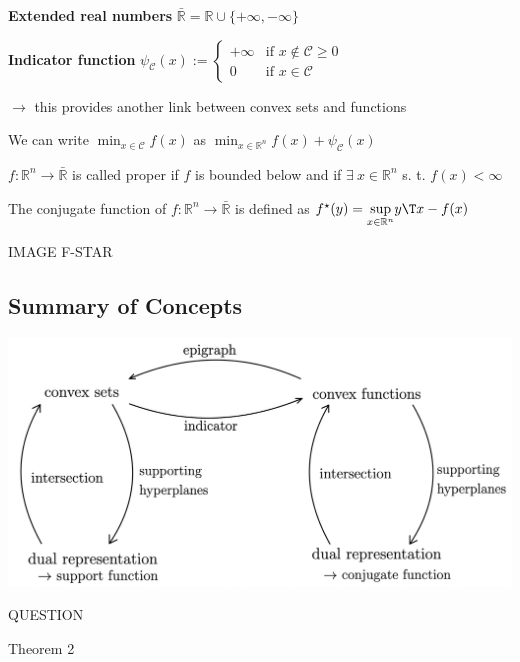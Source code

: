 \textbf{Extended real numbers} $\bar{\mathbb{R}} = \mathbb{R} \cup \{+\infty, -\infty\}$


\textbf{Indicator function}
$\psi_\mathcal{C}(x) := \begin{cases} +\infty &\text{if } x \notin\mathcal{C} \ge 0 \\ 0 &\text{if } x \in\mathcal{C} \end{cases}$

$\rightarrow$ this provides another link between convex sets and functions

We can write
$\min_{x \in \mathcal{C}}f(x)$ as
$\min_{x \in \mathbb{R}^{n}}f(x) + \psi_\mathcal{C}(x)$

\begin{definition}[3]
	$f: \mathbb{R}^{n}\rightarrow\bar{\mathbb{R}}$ is called proper
	if $f$ is bounded below and
	if $\exists\ x \in \mathbb{R}^{n}$ s. t. $f(x)<\infty$
\end{definition}

\begin{definition}
	The conjugate function of $f: \mathbb{R}^{n}\rightarrow\bar{\mathbb{R}}$  is defined as
	$f^\star(y)=\underset{x \in \mathbb{R}^{n}}{\operatorname{sup}}y\T x-f(x)$
\end{definition}

IMAGE F-STAR

\subsection{Summary of Concepts}


\includegraphics[width=\columnwidth]{images/summary_set_functions.png}

QUESTION

Theorem 2
